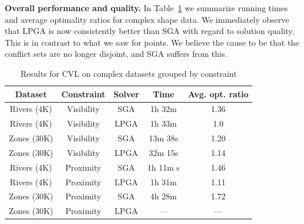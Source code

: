 \documentclass[11pt, oneside]{report}
\newcommand{\minisec}[1]{\noindent\textbf{#1.}}
\begin{document}
\minisec{Overall performance and quality}
In Table~\ref{tab:complex:overview} we summarize running times and average optimality ratios for complex shape data. We immediately observe that LPGA is now consistently better than SGA with regard to solution quality. This is in contrast to what we saw for points. We believe the cause to be that the conflict sets are no longer disjoint, and SGA suffers from this.

\begin{table}[htdp]
\caption{Results for CVL on complex datasets grouped by constraint}
\begin{center}
\begin{tabular}{|c|c|c|c|c|}
\hline
\textbf{Dataset} & \textbf{Constraint} & \textbf{Solver} & \textbf{Time} & \textbf{Avg. opt. ratio}\\ 
\hline
Rivers (4K) & Visibility & SGA & 1h 32m & 1.36 \\
Rivers (4K) & Visibility & LPGA & 1h 33m & 1.0 \\
Zones (30K) & Visibility & SGA & 13m 38s & 1.20 \\
Zones (30K) & Visibility & LPGA & 32m 15s & 1.14 \\
\hline
Rivers (4K)  & Proximity  & SGA& 1h 11m s & 1.46 \\
Rivers (4K)  & Proximity & LPGA & 1h 31m & 1.11 \\
Zones (30K) & Proximity & SGA & 4h 28m & 1.72 \\
Zones (30K) & Proximity & LPGA & --- & --- \\
\hline
\end{tabular}
\end{center}
\label{tab:complex:overview}
\end{table}%
\end{document}
